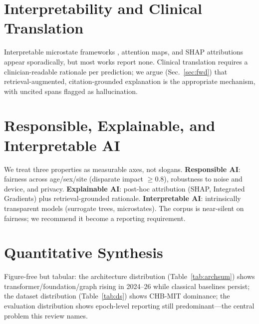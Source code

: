 \documentclass[10pt,journal,twocolumn]{IEEEtran}
\begin{document}
\section{Interpretability and Clinical Translation}
Interpretable microstate frameworks \citep{ep250902568}, attention maps, and SHAP attributions appear sporadically, but most works report none. Clinical translation requires a clinician-readable rationale per prediction; we argue (Sec.~\ref{sec:fwd}) that retrieval-augmented, citation-grounded explanation is the appropriate mechanism, with uncited spans flagged as hallucination.

\section{Responsible, Explainable, and Interpretable AI}
We treat three properties as measurable axes, not slogans. \textbf{Responsible AI}: fairness across age/sex/site (disparate impact $\geq0.8$), robustness to noise and device, and privacy. \textbf{Explainable AI}: post-hoc attribution (SHAP, Integrated Gradients) plus retrieval-grounded rationale. \textbf{Interpretable AI}: intrinsically transparent models (surrogate trees, microstates). The corpus is near-silent on fairness; we recommend it become a reporting requirement.

\section{Quantitative Synthesis}
Figure-free but tabular: the architecture distribution (Table~\ref{tab:archsum}) shows transformer/foundation/graph rising in 2024--26 while classical baselines persist; the dataset distribution (Table~\ref{tab:ds}) shows CHB-MIT dominance; the evaluation distribution shows epoch-level reporting still predominant---the central problem this review names.
\end{document}
